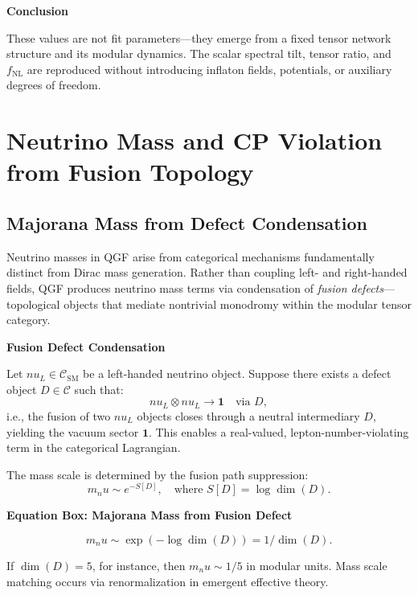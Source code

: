 \documentclass[11pt]{article}
\def\nu{nu}
\def\frac#1#2{#1/#2}
\begin{document}
\vspace{0.5em}
\noindent\textbf{Conclusion}

These values are not fit parameters—they emerge from a fixed tensor network structure and its modular dynamics. The scalar spectral tilt, tensor ratio, and \( f_{\text{NL}} \) are reproduced without introducing inflaton fields, potentials, or auxiliary degrees of freedom.



\section{Neutrino Mass and CP Violation from Fusion Topology}

\subsection{Majorana Mass from Defect Condensation}

Neutrino masses in QGF arise from categorical mechanisms fundamentally distinct from Dirac mass generation. Rather than coupling left- and right-handed fields, QGF produces neutrino mass terms via condensation of \textit{fusion defects}—topological objects that mediate nontrivial monodromy within the modular tensor category.

\vspace{0.5em}
\noindent\textbf{Fusion Defect Condensation}

Let \( \nu_L \in \mathcal{C}_{\text{SM}} \) be a left-handed neutrino object. Suppose there exists a defect object \( D \in \mathcal{C} \) such that:
\[
\nu_L \otimes \nu_L \rightarrow \mathbf{1} \quad \text{via } D,
\]
i.e., the fusion of two \( \nu_L \) objects closes through a neutral intermediary \( D \), yielding the vacuum sector \( \mathbf{1} \). This enables a real-valued, lepton-number-violating term in the categorical Lagrangian.

The mass scale is determined by the fusion path suppression:
\[
m_\nu \sim e^{-S[D]}, \quad \text{where } S[D] = \log \dim(D).
\]

\vspace{0.5em}
\noindent\textbf{Equation Box: Majorana Mass from Fusion Defect}

\begin{equation}
m_\nu \sim \exp(-\log \dim(D)) = \frac{1}{\dim(D)}.
\label{eq:majorana-mass}
\end{equation}

If \( \dim(D) = 5 \), for instance, then \( m_\nu \sim \frac{1}{5} \) in modular units. Mass scale matching occurs via renormalization in emergent effective theory.
\end{document}
